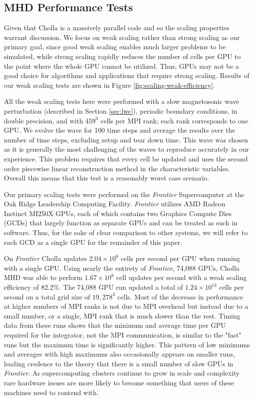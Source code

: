 \subsection{MHD Performance Tests}
\label{sec:mhd-perf-tests}

Given that Cholla is a massively parallel code and so the scaling properties warrant discussion. We focus on weak scaling rather than strong scaling as our primary goal, since good weak scaling enables much larger problems to be simulated, while strong scaling rapidly reduces the number of cells per GPU to the point where the whole GPU cannot be utilized. Thus, GPUs may not be a good choice for algorithms and applications that require strong scaling. Results of our weak scaling tests are shown in Figure \ref{fig:scaling-weak-efficiency}. 

All the weak scaling tests here were performed with a slow magnetosonic wave perturbation (described in Section \ref{sec:lwc}), periodic boundary conditions, in double precision, and with $459^3$ cells per MPI rank; each rank corresponds to one GPU. We evolve the wave for 100 time steps and average the results over the number of time steps, excluding setup and tear down time. This wave was chosen as it is generally the most challenging of the waves to reproduce accurately in our experience. This problem requires that every cell be updated and uses the second order piecewise linear reconstruction method in the characteristic variables. Overall this means that this test is a reasonably worst case scenario.

Our primary scaling tests were performed on the \textit{Frontier} Supercomputer at the Oak Ridge Leadership Computing Facility. \textit{Frontier} utilizes AMD Radeon Instinct MI250X GPUs, each of which contains two Graphics Compute Dies (GCDs) that largely function as separate GPUs and can be treated as such in software. Thus, for the sake of clear comparison to other systems, we will refer to each GCD as a single GPU for the remainder of this paper. 

On \textit{Frontier} Cholla updates $2.04\times10^8$ cells per second per GPU when running with a single GPU. Using nearly the entirety of \textit{Frontier}, 74,088 GPUs, Cholla MHD was able to perform $1.67\times10^8$ cell updates per second with a weak scaling efficiency of 82.2\%. The 74,088 GPU run updated a total of $1.24\times10^{13}$ cells per second on a total grid size of $19,278^3$ cells. Most of the decrease in performance at higher numbers of MPI ranks is not due to MPI overhead but instead due to a small number, or a single, MPI rank that is much slower than the rest. Timing data from these runs shows that the minimum and average time per GPU required for the integrator, not the MPI communication, is similar to the "fast" runs but the maximum time is significantly higher. This pattern of low minimums and averages with high maximums also occasionally appears on smaller runs, leading credence to the theory that there is a small number of slow GPUs in \textit{Frontier}. As supercomputing clusters continue to grow in scale and complexity rare hardware issues are more likely to become something that users of these machines need to contend with.

